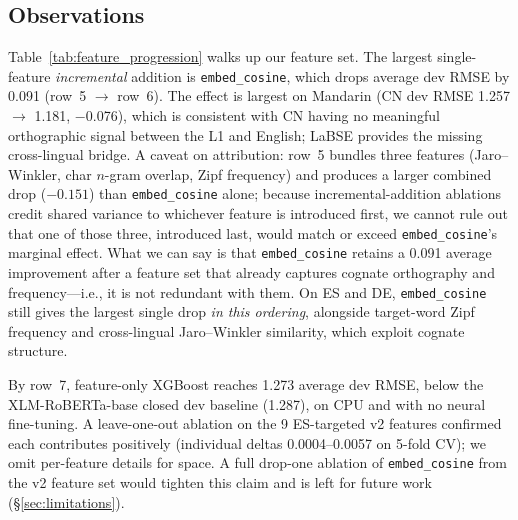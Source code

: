 \documentclass[11pt]{article}
\begin{document}

\subsection{Observations}

Table~\ref{tab:feature_progression} walks up our feature set. The largest single-feature \emph{incremental} addition is \texttt{embed\_cosine}, which drops average dev RMSE by 0.091 (row~5 $\rightarrow$ row~6). The effect is largest on Mandarin (CN dev RMSE 1.257 $\rightarrow$ 1.181, $-$0.076), which is consistent with CN having no meaningful orthographic signal between the L1 and English; LaBSE provides the missing cross-lingual bridge. A caveat on attribution: row~5 bundles three features (Jaro--Winkler, char $n$-gram overlap, Zipf frequency) and produces a larger combined drop ($-0.151$) than \texttt{embed\_cosine} alone; because incremental-addition ablations credit shared variance to whichever feature is introduced first, we cannot rule out that one of those three, introduced last, would match or exceed \texttt{embed\_cosine}'s marginal effect. What we can say is that \texttt{embed\_cosine} retains a 0.091 average improvement after a feature set that already captures cognate orthography and frequency---i.e., it is not redundant with them. On ES and DE, \texttt{embed\_cosine} still gives the largest single drop \emph{in this ordering}, alongside target-word Zipf frequency and cross-lingual Jaro--Winkler similarity, which exploit cognate structure.

By row~7, feature-only XGBoost reaches 1.273 average dev RMSE, below the XLM-RoBERTa-base closed dev baseline (1.287), on CPU and with no neural fine-tuning. A leave-one-out ablation on the 9 ES-targeted v2 features confirmed each contributes positively (individual deltas 0.0004--0.0057 on 5-fold CV); we omit per-feature details for space. A full drop-one ablation of \texttt{embed\_cosine} from the v2 feature set would tighten this claim and is left for future work (\S\ref{sec:limitations}).
\end{document}
